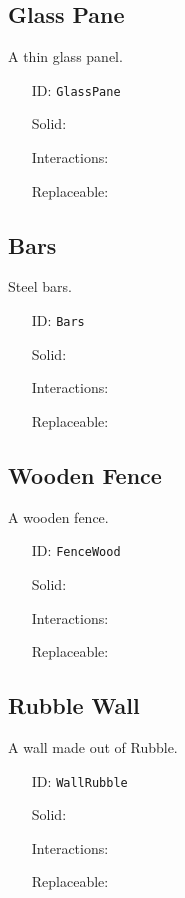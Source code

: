 \subsection{Glass Pane}\label{subsec:blocks_glass pane}
A thin glass panel.
\newline
\begin{itemize}[nosep]
    \item[ID:] \texttt{GlassPane}
    \item[Solid:]  \Checkmark \item[Interactions:]  \XSolidBrush \item[Replaceable:]  \XSolidBrush
\end{itemize}

\subsection{Bars}\label{subsec:blocks_bars}
Steel bars.
\newline
\begin{itemize}[nosep]
    \item[ID:] \texttt{Bars}
    \item[Solid:]  \Checkmark \item[Interactions:]  \XSolidBrush \item[Replaceable:]  \XSolidBrush
\end{itemize}

\subsection{Wooden Fence}\label{subsec:blocks_wooden fence}
A wooden fence.
\newline
\begin{itemize}[nosep]
    \item[ID:] \texttt{FenceWood}
    \item[Solid:]  \Checkmark \item[Interactions:]  \XSolidBrush \item[Replaceable:]  \XSolidBrush
\end{itemize}

\subsection{Rubble Wall}\label{subsec:blocks_rubble wall}
A wall made out of Rubble.
\newline
\begin{itemize}[nosep]
    \item[ID:] \texttt{WallRubble}
    \item[Solid:]  \Checkmark \item[Interactions:]  \XSolidBrush \item[Replaceable:]  \XSolidBrush
\end{itemize}

